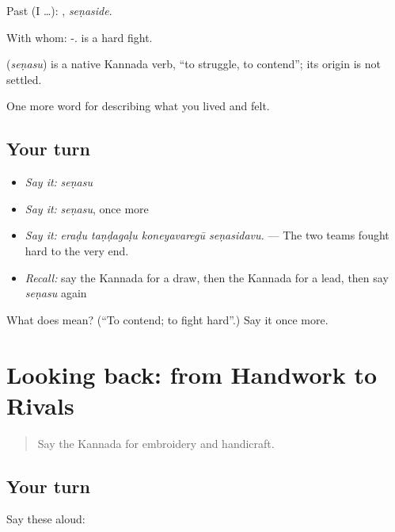 Past (I …): , \emph{seṇaside}.

With whom: -.  is a hard fight.

\begin{cousinweb}
\textbf{} (\emph{seṇasu}) is a native Kannada verb, \textquotedblleft{}to struggle, to contend\textquotedblright{}; its origin is not settled.
\end{cousinweb}

\begin{grammarlens}[title={What you've built}]
One more word for describing what you lived and felt.
\end{grammarlens}

\subsection*{Your turn}
\begin{itemize}
\raggedright
  \item \emph{Say it:} \emph{seṇasu}
  \item \emph{Say it:} \emph{seṇasu}, once more
  \item \emph{Say it:} \emph{eraḍu taṇḍagaḷu koneyavaregū seṇasidavu.} — The two teams fought hard to the very end.
  \item \emph{Recall:} say the Kannada for a draw, then the Kannada for a lead, then say \emph{seṇasu} again
\end{itemize}

\begin{tcolorbox}[breakable,colback=teal!4,colframe=teal!35!black,title={Before you move on}]
What does  mean? (\textquotedblleft{}To contend; to fight hard\textquotedblright{}.) Say it once more.
\end{tcolorbox}
\section[(dialogue)]{Looking back: from Handwork to Rivals}

\label{lesson:KA-R539-review-533-539}



\begin{quote}
Say the Kannada for embroidery and handicraft.
\end{quote}

\subsection*{Your turn}
Say these aloud:

